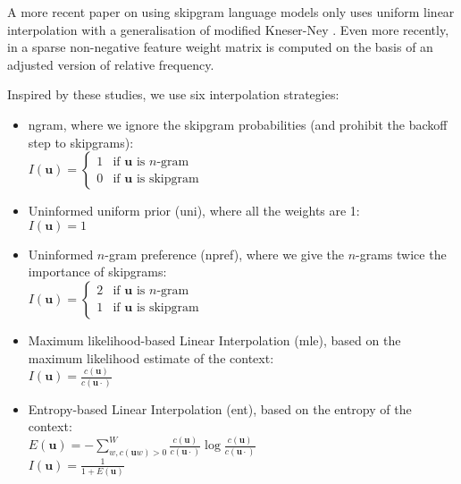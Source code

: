   A more recent paper on using skipgram language models only uses uniform linear interpolation with a generalisation of modified Kneser-Ney \cite{pickhardt2014generalized}. Even more recently, in \cite{pelemans2016sparse} a sparse non-negative feature weight matrix is computed on the basis of an adjusted version of relative frequency.
  
Inspired by these studies, we use six interpolation strategies:
  
  \begin{itemize}
  \item \textsf{ngram}, where we ignore the skipgram probabilities (and prohibit the backoff step to skipgrams): \\
	$I(\mathbf{u}) =
  \begin{cases}
    1 & \text{if } \mathbf{u} \text{ is }n\text{-gram} \\
    0 & \text{if } \mathbf{u} \text{ is skipgram}
  \end{cases}$
\item \textsf{Uninformed uniform prior (uni)}, where all the weights are 1:\\ 
	$ I(\mathbf{u}) = 1 $
\item \textsf{Uninformed $n$-gram preference (npref)}, where we give the $n$-grams twice the importance of skipgrams: \\
	$I(\mathbf{u}) =
  \begin{cases}
    2 & \text{if } \mathbf{u} \text{ is }n\text{-gram} \\
    1 & \text{if } \mathbf{u} \text{ is skipgram}
  \end{cases}$
  \item \textsf{Maximum likelihood-based Linear Interpolation (mle)}, based on the maximum likelihood estimate of the context: \\[0.5ex]
	$ I(\mathbf{u}) = \displaystyle \frac{c(\mathbf{u})}{c(\mathbf{u}\cdot)} $ \\
\item \textsf{Entropy-based Linear Interpolation (ent)}, based on the entropy of the context: \\
	$E(\mathbf{u}) = -\displaystyle \sum_{w,c(\mathbf{u}w)>0}^W\frac{c(\mathbf{u})}{c(\mathbf{u}\cdot)}\log\frac{c(\mathbf{u})}{c(\mathbf{u}\cdot)} $ \\
    $ I(\mathbf{u}) = \displaystyle \frac{1}{1+E(\mathbf{u})}$ \\

\end{itemize}
